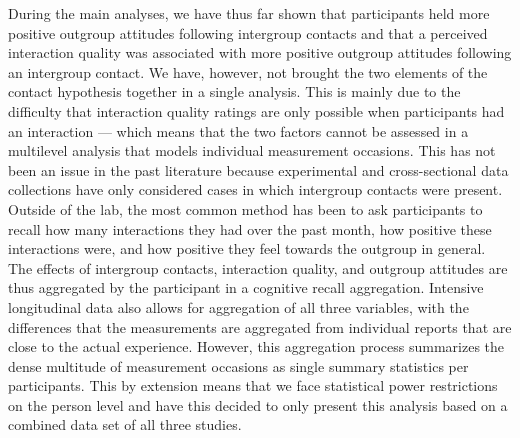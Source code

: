 During the main analyses, we have thus far shown that participants held
more positive outgroup attitudes following intergroup contacts and that
a perceived interaction quality was associated with more positive
outgroup attitudes following an intergroup contact. We have, however,
not brought the two elements of the contact hypothesis together in a
single analysis. This is mainly due to the difficulty that interaction
quality ratings are only possible when participants had an interaction
--- which means that the two factors cannot be assessed in a multilevel
analysis that models individual measurement occasions. This has not been
an issue in the past literature because experimental and cross-sectional
data collections have only considered cases in which intergroup contacts
were present. Outside of the lab, the most common method has been to ask
participants to recall how many interactions they had over the past
month, how positive these interactions were, and how positive they feel
towards the outgroup in general. The effects of intergroup contacts,
interaction quality, and outgroup attitudes are thus aggregated by the
participant in a cognitive recall aggregation. Intensive longitudinal
data also allows for aggregation of all three variables, with the
differences that the measurements are aggregated from individual reports
that are close to the actual experience. However, this aggregation
process summarizes the dense multitude of measurement occasions as
single summary statistics per participants. This by extension means that
we face statistical power restrictions on the person level and have this
decided to only present this analysis based on a combined data set of
all three studies.

